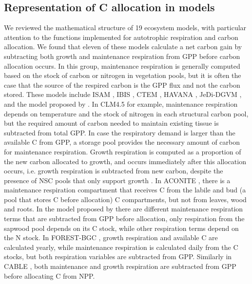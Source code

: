 \documentclass[bg, manuscript]{copernicus}
\begin{document}
\subsection{Representation of C allocation in models} 
We reviewed the mathematical structure of 19 ecosystem models, with particular attention to the functions implemented for autotrophic respiration and carbon allocation. We found that eleven of these models calculate a net carbon gain by subtracting both growth and maintenance respiration from GPP before carbon allocation occurs. In this group, maintenance respiration is generally computed based on the stock of carbon or nitrogen in vegetation pools, but it is often the case that the source of the respired carbon is the GPP flux and not the carbon stored.
These models include ISAM \citep{ElMasri2013AgricForMeteorol}, IBIS \citep{Foley1996GBC}, CTEM \citep{Arora2005GCB}, HAVANA \citep{Haverd2016Biogeosciences}, JeDi-DGVM \citep{Pavlick2013Biogeosciences}, and  the model proposed by \citet{Trugman2018EcologyLetters}. 
In CLM4.5 \citep{Oleson2013} for example, maintenance respiration depends on temperature and the stock of nitrogen in each structural carbon pool, but the required amount of carbon needed to maintain existing tissue is subtracted from total GPP. In case the respiratory demand is larger than the available C from GPP, a storage pool provides the necessary amount of carbon for maintenance respiration. Growth respiration is computed as a proportion of the new carbon allocated to growth, and occurs immediately after this allocation occurs, i.e. growth respiration is subtracted from new carbon, despite the presence of NSC pools that only support growth \citep{Oleson2013}.
In ACONITE \citep{Thomas2014GeosciModelDev}, there is a maintenance respiration compartment that receives C from the labile and bud (a pool that stores C before allocation) C compartments, but not from leaves, wood and roots. In the model proposed by \citet{Murty2000EcolModel} there are different maintenance respiration terms that are subtracted from GPP before allocation, only respiration from the sapwood pool depends on its C stock, while other respiration terms depend on the N stock. In FOREST-BGC \citep{Running1988EcolModel}, growth respiration and available C are calculated yearly, while maintenance respiration is calculated daily from the C stocks, but both respiration variables are subtracted from GPP. 
Similarly in CABLE \citep{Wang2010Biogeosciences, Wang2012}, both maintenance and growth respiration are subtracted from GPP before allocating C from NPP.
\end{document}
